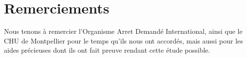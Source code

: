 \documentclass[a4paper,pagenum,french]{rnti}
\affiliation{
    \affil{1}IRISA Rennes, UMR 6074\\
    Cedric.Maigrot@irisa.fr\\
    \affil{2}LIRMM, CNRS, UMR 5506\\
    \{Sandra.Bringay, Jerome.Aze\}@lirmm.fr\\
    \affil{3}AMIS, Université de Montpellier Paul Valéry\\
 }
\theoremstyle{remark}
\begin{document}






\section{Remerciements}
Nous tenons à remercier l'Organisme Arret Demandé International, ainsi que le CHU de Montpellier pour le temps qu'ils nous ont accordés, mais aussi pour les aides précieuses dont ils ont fait preuve rendant cette étude possible.




\end{document}
